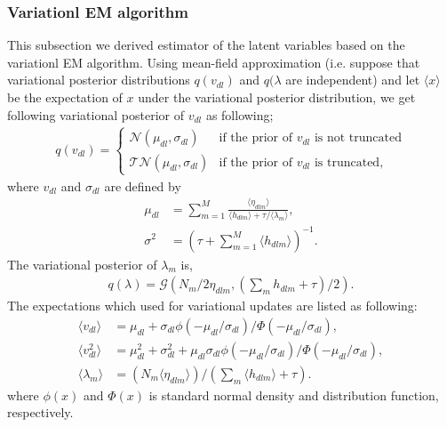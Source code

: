 \documentclass[a4paper,12ptc]{jsarticle} %
\newcommand{\normal}{\mathcal{N}}
\newcommand{\truncnorm}{\mathcal{TN}}
\newcommand{\gam}{\mathcal{G}}
\begin{document}
\subsubsection{Variationl EM algorithm}
This subsection we derived estimator of the latent variables based on the variationl EM algorithm\cite{Jordan}. 
Using mean-field approximation (i.e. suppose that variational posterior distributions $q(v_{dl})$ and $q(\lambda$ are independent) and let $\langle x \rangle$ be the expectation of $x$ under the variational posterior distribution, we get following variational posterior of $v_{dl}$ as following; 
\begin{align}
q(v_{dl})= \begin{cases}
\normal(\mu_{dl}, \sigma_{dl}) & \mbox{if the prior of $v_{dl}$ is not truncated} \\
\truncnorm(\mu_{dl}, \sigma_{dl}) & \mbox{if the prior of $v_{dl}$ is truncated},     
\end{cases} \label{qv}
\end{align}
where $v_{dl}$ and $\sigma_{dl}$ are defined by
\begin{align*}
\mu_{dl} &=\sum_{m=1}^M \frac{\langle \eta_{dlm} \rangle}{\langle h_{dlm}\rangle+\tau/\langle\lambda_m\rangle},\\
\sigma^2 &=\left(\tau + \sum_{m=1}^M \langle h_{dlm} \rangle \right)^{-1}.
\end{align*}
The variational posterior of $\lambda_{m}$ is,  
\begin{align}
    q(\lambda) = \gam\left(N_m/2 \eta_{dlm}, \left(\sum_m h_{dlm}+\tau\right)/2\right). \label{qlam}
\end{align}
The expectations which used for variational updates are listed as following:
\begin{align*}
\langle v_{dl}\rangle &=\mu_{dl} + \sigma_{dl} \phi(-\mu_{dl}/\sigma_{dl})/\Phi(-\mu_{dl}/\sigma_{dl}),\\
\langle v_{dl}^2 \rangle&=\mu_{dl}^2 + \sigma_{dl}^2 + \mu_{dl} \sigma_{dl} \phi(-\mu_{dl}/\sigma_{dl})/\Phi(-\mu_{dl}/\sigma_{dl}),\\
\langle \lambda_m \rangle &= (N_m \langle \eta_{dlm} \rangle ) / \left(\sum_m \langle h_{dlm} \rangle +\tau\right).
\end{align*}
where $\phi(x)$ and $\Phi(x)$ is standard normal density and distribution function, respectively.
\end{document}
